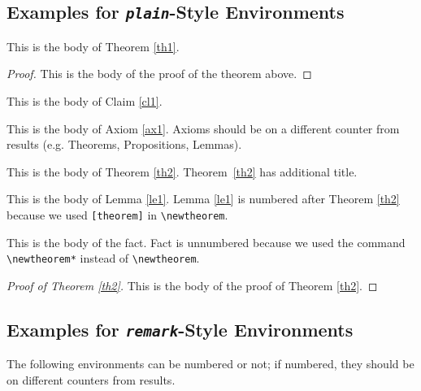 \documentclass[rbe,fleqn]{econbr}
\begin{document}
\subsection{Examples for \emph{\texttt{plain}}-Style Environments}

\begin{theorem}\label{th1}
This is the body of Theorem \ref{th1}.
\end{theorem}

\begin{proof}
This is the body of the proof of the theorem above.
\end{proof}

\begin{claim}\label{cl1}
This is the body of Claim \ref{cl1}. 
\end{claim}

\begin{axiom}\label{ax1}
This is the body of Axiom \ref{ax1}. Axioms should be on a different counter from results (e.g. Theorems, Propositions, Lemmas).
\end{axiom}

\begin{theorem}\label{th2}
This is the body of Theorem \ref{th2}. Theorem~\ref{th2} has additional title.
\end{theorem}

\begin{lemma}\label{le1}
This is the body of Lemma \ref{le1}. Lemma \ref{le1} is numbered after Theorem \ref{th2} because we used \verb|[theorem]| in \verb|\newtheorem|.
\end{lemma}

\begin{fact}
This is the body of the fact. Fact is unnumbered because we used the command \verb|\newtheorem*| instead of \verb|\newtheorem|.
\end{fact}

\begin{proof}[Proof of Theorem \ref{th2}]
This is the body of the proof of Theorem \ref{th2}.
\end{proof}

\subsection{Examples for \emph{\texttt{remark}}-Style Environments}

The following environments can be numbered or not; if numbered, they should be on different counters from results.
\end{document}
